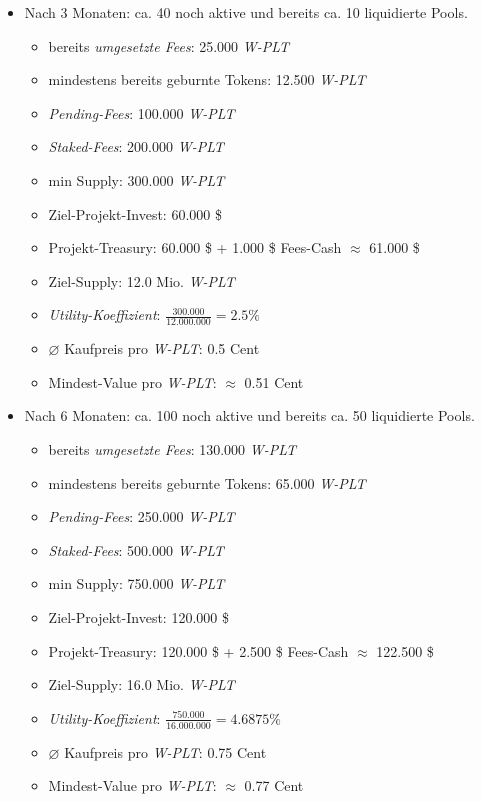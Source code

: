 \begin{Example}
\begin{itemize}
	\item Nach 3 Monaten: ca. 40 noch aktive und bereits ca. 10 liquidierte Pools.
	\begin{itemize}
		\item bereits \textit{umgesetzte Fees}: 25.000 \textit{W-PLT} 
		\item mindestens bereits geburnte Tokens: 12.500 \textit{W-PLT} 
		\item \textit{Pending-Fees}: 100.000 \textit{W-PLT}  
		\item \textit{Staked-Fees}: 200.000 \textit{W-PLT}
		\item min Supply: 300.000 \textit{W-PLT}
		\item Ziel-Projekt-Invest: 60.000 \$ 
		\item Projekt-Treasury: 60.000 \$ + 1.000 \$ Fees-Cash $\approx$ 61.000 \$
		\item Ziel-Supply: 12.0 Mio. \textit{W-PLT}
		\item \textit{Utility-Koeffizient}: $\frac{300.000}{12.000.000} = 2.5 \%$
		\item $\varnothing$ Kaufpreis pro \textit{W-PLT}: 0.5 Cent
		\item Mindest-Value pro \textit{W-PLT}: $\approx$ 0.51 Cent
	\end{itemize}
	\item Nach 6 Monaten: ca. 100 noch aktive und bereits ca. 50 liquidierte Pools.
	\begin{itemize}
		\item bereits \textit{umgesetzte Fees}: 130.000 \textit{W-PLT}
		\item mindestens bereits geburnte Tokens: 65.000 \textit{W-PLT}  
		\item \textit{Pending-Fees}: 250.000 \textit{W-PLT}
		\item \textit{Staked-Fees}: 500.000 \textit{W-PLT} 
		\item min Supply: 750.000 \textit{W-PLT}
		\item Ziel-Projekt-Invest: 120.000 \$
		\item Projekt-Treasury: 120.000 \$ + 2.500 \$ Fees-Cash $\approx$ 122.500 \$
		\item Ziel-Supply: 16.0 Mio. \textit{W-PLT}
		\item \textit{Utility-Koeffizient}: $\frac{750.000}{16.000.000} = 4.6875 \%$
		\item $\varnothing$ Kaufpreis pro \textit{W-PLT}: 0.75 Cent
		\item Mindest-Value pro \textit{W-PLT}: $\approx$ 0.77 Cent

\end{itemize}
\end{itemize}
\end{Example}
